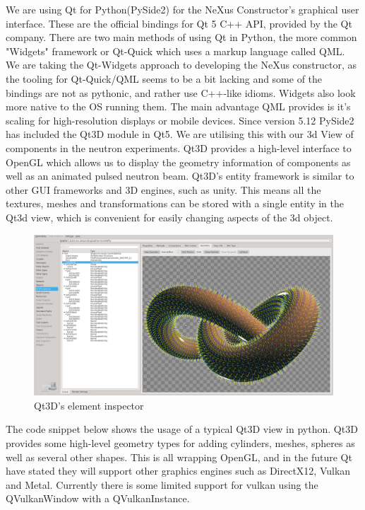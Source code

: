 We are using Qt for Python(PySide2) for the NeXus Constructor's graphical user interface. These are the official bindings for Qt 5 C++ API, provided by the Qt company.
\bigskip
There are two main methods of using Qt in Python, the more common "Widgets" framework or Qt-Quick which uses a markup language called QML.
We are taking the Qt-Widgets approach to developing the NeXus constructor, as the tooling for Qt-Quick/QML seems to be a bit lacking and some of the bindings are not as pythonic, and rather use C++-like idioms. Widgets also look more native to the OS running them. The main advantage QML provides is it's scaling for high-resolution displays or mobile devices.
\bigskip
Since version 5.12 PySide2 has included the Qt3D module in Qt5. We are utilising this with our 3d View of components in the neutron experiments. Qt3D provides a high-level interface to OpenGL which allows us to display the geometry information of components as well as an animated pulsed neutron beam. Qt3D's entity framework is similar to other GUI frameworks and 3D engines, such as unity. This means all the textures, meshes and transformations can be stored with a single entity in the Qt3d view, which is convenient for easily changing aspects of the 3d object. 
\bigskip
\begin{figure}
\caption{Qt3D's element inspector}
\includegraphics[width=\linewidth]{qt3d.png}
\end{figure}
\bigskip

The code snippet below shows the usage of a typical Qt3D view in python. Qt3D provides some high-level geometry types for adding cylinders, meshes, spheres as well as several other shapes. This is all wrapping OpenGL, and in the future Qt have stated they will support other graphics engines such as DirectX12, Vulkan and Metal. Currently there is some limited support for vulkan using the QVulkanWindow with a QVulkanInstance.

